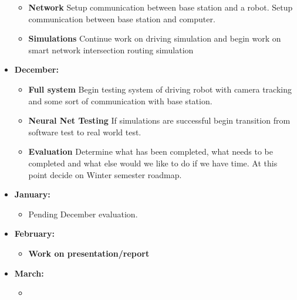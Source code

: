 \documentclass[a4paper]{article}
\begin{document}
\begin{itemize}
\begin{itemize}
				\item \textbf{Network} Setup communication between base station and a robot. Setup communication between base station and computer.
				\item \textbf{Simulations} Continue work on driving simulation and begin work on smart network intersection routing simulation
			\end{itemize}
		\item \textbf{December:}
			\begin{itemize}
				\item \textbf{Full system} Begin testing system of driving robot with camera tracking and some sort of communication with base station.
				\item \textbf{Neural Net Testing} If simulations are successful begin transition from software test to real world test.
				\item \textbf{Evaluation} Determine what has been completed, what needs to be completed and what else would we like to do if we have time. At this point decide on Winter semester roadmap.
			\end{itemize}
		\item \textbf{January:}
			\begin{itemize}
				\item Pending December evaluation.
			\end{itemize}
		\item \textbf{February:}
			\begin{itemize}
				\item \textbf{Work on presentation/report}
			\end{itemize}
		\item \textbf{March:}
			\begin{itemize}
				\item 
			\end{itemize}
	\end{itemize}
\end{document}
